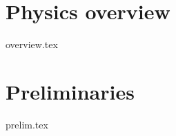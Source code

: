 \section{Physics overview}\label{sec:intro:overview}
    {{overview.tex}}






    
    



\section{Preliminaries}\label{sec:intro:prelim}
    {{prelim.tex}}




